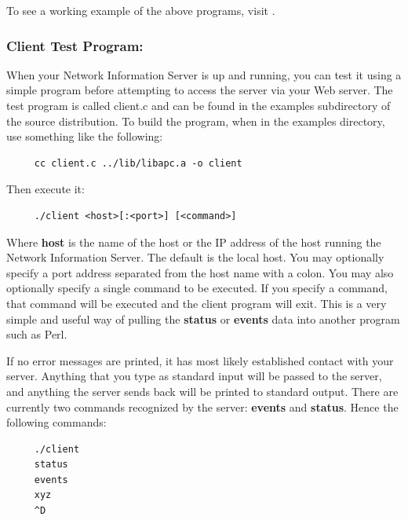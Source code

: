 {{{{{\label{index-CGI_002c-working-example-134}
\label{index-Example_002c-CGI-135}
To see a working example of the above programs, visit 
. 

\label{Client-Test-Program}

\subsubsection*{Client Test Program:}

\label{index-Client-Test-program-136}
When your Network Information Server is up and running, you can test it using
a simple program before attempting to access the server via your Web server.
The test program is called client.c and can be found in the examples
subdirectory of the source distribution. To build the program, when in the
examples directory, use something like the following: 

\footnotesize
\begin{verbatim}
     cc client.c ../lib/libapc.a -o client
\end{verbatim}
\normalsize

Then execute it: 

\footnotesize
\begin{verbatim}
     ./client <host>[:<port>] [<command>]
\end{verbatim}
\normalsize

Where {\bf host} is the name of the host or the IP address of the host running
the Network Information Server. The default is the local host. You may
optionally specify a port address separated from the host name with a colon.
You may also optionally specify a single command to be executed. If you
specify a command, that command will be executed and the client program will
exit. This is a very simple and useful way of pulling the {\bf status} or {\bf
events} data into another program such as Perl.  

If no error messages are printed, it has most likely established contact with
your server. Anything that you type as standard input will be passed to the
server, and anything the server sends back will be printed to standard output.
There are currently two commands recognized by the server: {\bf events} and
{\bf status}.  Hence the following commands: 

\footnotesize
\begin{verbatim}
     ./client
     status
     events
     xyz
     ^D
\end{verbatim}
\normalsize

}}}}}
